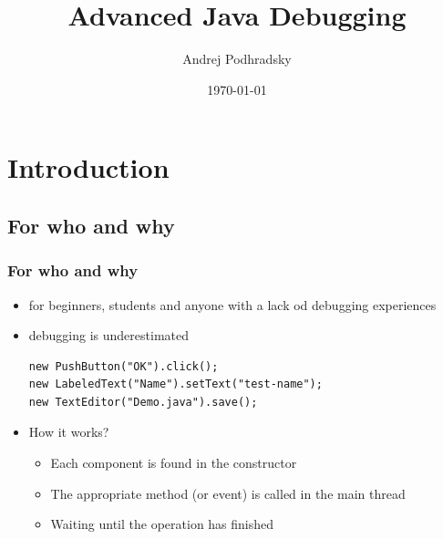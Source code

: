 \documentclass{beamer}
\begin{document}
\title{Advanced Java Debugging}   
\author{Andrej Podhradsky}
\date{\today} 



\frame{\titlepage} 


\section{Introduction}
\subsection{For who and why}
\begin{frame}[fragile]
\frametitle{For who and why}
\begin{itemize}
\item for beginners, students and anyone with a lack od debugging experiences
\item debugging is underestimated
\begin{lstlisting}
new PushButton("OK").click();
new LabeledText("Name").setText("test-name");
new TextEditor("Demo.java").save();
\end{lstlisting}
\item How it works?
\begin{itemize}
\item Each component is found in the constructor
\item The appropriate method (or event) is called in the main thread
\item Waiting until the operation has finished
\end{itemize}
\end{itemize}
\end{frame}
\end{document}
